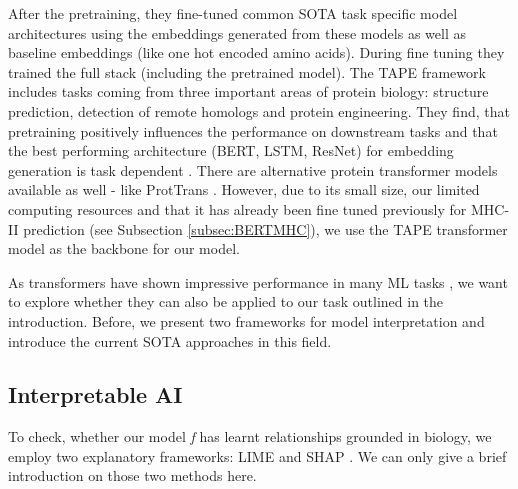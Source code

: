 \documentclass[msc,deptreport,ai]{infthesis} %
\begin{document}
		After the pretraining, they fine-tuned common \gls{SOTA} task specific model architectures using the embeddings generated from these models as well as baseline embeddings (like one hot encoded amino acids). During fine tuning they trained the full stack (including the pretrained model). The \gls{TAPE} framework includes tasks coming from three important areas of protein biology: structure prediction, detection of remote homologs and protein engineering. They find, that pretraining positively influences the performance on downstream tasks and that the best performing architecture (\gls{BERT}, \acrshort{LSTM}, \acrshort{ResNet}) for embedding generation is task dependent \cite[Table 2]{rao_evaluating_2019}. There are alternative protein transformer models available as well - like ProtTrans \cite{elnaggar_prottrans_2021}. However, due to its small size, our limited computing resources and that it has already been fine tuned previously for \gls{MHC-II} prediction (see Subsection \ref{subsec:BERTMHC}), we use the \gls{TAPE} transformer model as the backbone for our model.

		As transformers have shown impressive performance in many \gls{ML} tasks \cite{vaswani_attention_2017, brown_language_2020, dosovitskiy_image_2020, rao_evaluating_2019, elnaggar_prottrans_2021}, we want to explore whether they can also be applied to our task outlined in the introduction. Before, we present two frameworks for model interpretation and introduce the current \gls{SOTA} approaches in this field.
		
	\subsection{Interpretable AI}
	\label{subsec:interpretable_ai}
	To check, whether our model \textit{f} has learnt relationships grounded in biology, we employ two explanatory frameworks: \gls{LIME} \cite{ribeiro_why_2016} and \gls{SHAP} \cite{lundberg_unified_2017}.  We can only give a brief introduction on those two methods here.
	
\end{document}
